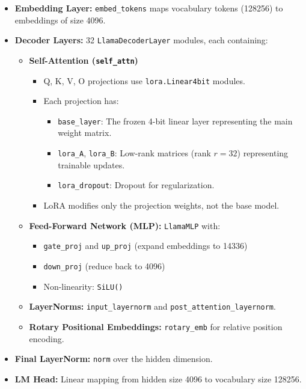 \documentclass[a4paper, 12pt]{article}
\begin{document}
\begin{itemize}
    \item \textbf{Embedding Layer:} \texttt{embed\_tokens} maps vocabulary tokens (128256) to embeddings of size 4096.
    \item \textbf{Decoder Layers:} 32 \texttt{LlamaDecoderLayer} modules, each containing:
        \begin{itemize}
            \item \textbf{Self-Attention (\texttt{self\_attn})}
                \begin{itemize}
                    \item Q, K, V, O projections use \texttt{lora.Linear4bit} modules.
                    \item Each projection has:
                        \begin{itemize}
                            \item \texttt{base\_layer}: The frozen 4-bit linear layer representing the main weight matrix.
                            \item \texttt{lora\_A}, \texttt{lora\_B}: Low-rank matrices (rank $r=32$) representing trainable updates.
                            \item \texttt{lora\_dropout}: Dropout for regularization.
                        \end{itemize}
                    \item LoRA modifies only the projection weights, not the base model.
                \end{itemize}
            \item \textbf{Feed-Forward Network (MLP):} \texttt{LlamaMLP} with:
                \begin{itemize}
                    \item \texttt{gate\_proj} and \texttt{up\_proj} (expand embeddings to 14336)  
                    \item \texttt{down\_proj} (reduce back to 4096)  
                    \item Non-linearity: \texttt{SiLU()}
                \end{itemize}
            \item \textbf{LayerNorms:} \texttt{input\_layernorm} and \texttt{post\_attention\_layernorm}.
            \item \textbf{Rotary Positional Embeddings:} \texttt{rotary\_emb} for relative position encoding.
        \end{itemize}
    \item \textbf{Final LayerNorm:} \texttt{norm} over the hidden dimension.
    \item \textbf{LM Head:} Linear mapping from hidden size 4096 to vocabulary size 128256.
\end{itemize}
\end{document}
